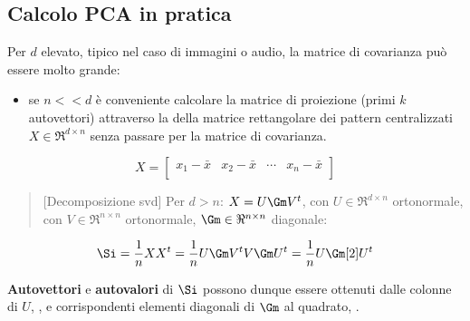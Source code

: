 \subsection{Calcolo PCA in pratica}\label{sub:calcolo_pca_in_pratica} %
Per $d$ elevato, tipico nel caso di immagini o audio, la matrice di covarianza può essere molto grande:
\begin{itemize}
    \item se $n << d$ è conveniente calcolare la matrice di proiezione (primi $k$ autovettori) attraverso la  della matrice rettangolare dei pattern centralizzati $X \in \Re^{d\times n}$ senza passare per la matrice di covarianza.
\end{itemize}
\[
    X = \begin{bmatrix}
        x_1- \bar x & x_2- \bar x & \cdots & x_n - \bar x \\
    \end{bmatrix}
\]
\begin{quote}[Decomposizione \ac{svd}]
    Per $d > n$: $X = U\Gm V^t$, con $U \in \Re^{d\times n}$ ortonormale, con $V \in \Re^{n\times n}$ ortonormale, $\Gm \in \Re^{n\times n}$ diagonale:
\end{quote}
\[
    \Si = \frac{1}{n}XX^t = \frac{1}{n}U\Gm V^t V \Gm U^t = \frac{1}{n}U \Gm[2]U^t
\]
\begin{note}
    \textbf{Autovettori} e \textbf{autovalori} di $\Si$ possono dunque essere ottenuti dalle colonne di $U$, , e corrispondenti elementi diagonali di $\Gm$ al quadrato, .
\end{note}
